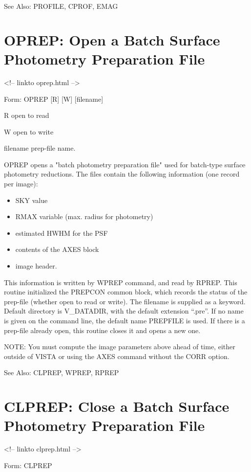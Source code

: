 See Also:  PROFILE, CPROF, EMAG


\section{OPREP: Open a Batch Surface Photometry Preparation File}
\begin{rawhtml}
<!-- linkto oprep.html -->
\end{rawhtml}
\begin{command}
  \item[Form: OPREP {[R]} {[W]} {[filename]}\hfill]{}
  \item[R]{open to read}
  \item[W]{open to write}
  \item[filename]{prep-file name.}
\end{command}

OPREP opens a "batch photometry preparation file" used for batch-type
surface photometry reductions.  The files contain the following information
(one record per image):
\begin{itemize}
  \item{SKY value}
  \item{RMAX variable (max. radius for photometry)}
  \item{estimated HWHM for the PSF}
  \item{contents of the AXES block}
  \item{image header.}
\end{itemize}

This information is written by WPREP command, and read by RPREP.  This
routine initialized the PREPCON common block, which records the status of
the prep-file (whether open to read or write).  The filename is supplied as
a keyword.  Default directory is V\_DATADIR, with the default extension
``.pre''.  If no name is given on the command line, the default name
PREPFILE is used.  If there is a prep-file already open, this routine closes
it and opens a new one.

NOTE: You must compute the image parameters above ahead of time, either
outside of VISTA or using the AXES command without the CORR option.

See Also:  CLPREP, WPREP, RPREP


\section{CLPREP: Close a Batch Surface Photometry Preparation File}
\begin{rawhtml}
<!-- linkto clprep.html -->
\end{rawhtml}
\begin{command}
  \item[Form: CLPREP\hfill]{}
\end{command}

